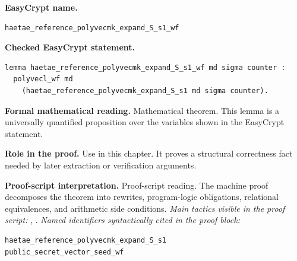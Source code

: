 \begin{formaltheorem}
\noindent\textbf{EasyCrypt name.}
\begin{lstlisting}[language=EasyCrypt,basicstyle=\ttfamily\scriptsize]
haetae_reference_polyvecmk_expand_S_s1_wf
\end{lstlisting}
\noindent\textbf{Checked EasyCrypt statement.}
\begin{lstlisting}[language=EasyCrypt,basicstyle=\ttfamily\scriptsize]
lemma haetae_reference_polyvecmk_expand_S_s1_wf md sigma counter :
  polyvecl_wf md
    (haetae_reference_polyvecmk_expand_S_s1 md sigma counter).
\end{lstlisting}
\noindent\textbf{Formal mathematical reading.}
Mathematical theorem. This lemma is a universally quantified proposition over the variables shown in the EasyCrypt statement.

\noindent\textbf{Role in the proof.}
Use in this chapter. It proves a structural correctness fact needed by later extraction or verification arguments.

\noindent\textbf{Proof-script interpretation.}
Proof-script reading. The machine proof decomposes the theorem into rewrites, program-logic obligations, relational equivalences, and arithmetic side conditions.
\emph{Main tactics visible in the proof script:} , .
\emph{Named identifiers syntactically cited in the proof block:}
\begin{lstlisting}[language=EasyCrypt,basicstyle=\ttfamily\scriptsize]
haetae_reference_polyvecmk_expand_S_s1
public_secret_vector_seed_wf
\end{lstlisting}

\end{formaltheorem}

